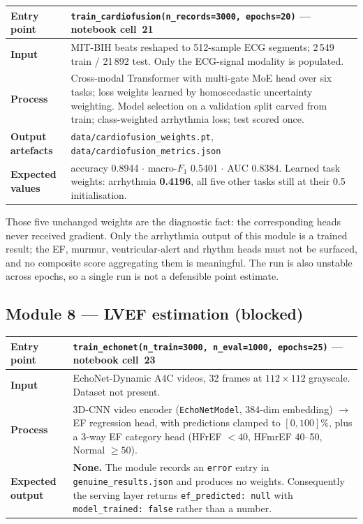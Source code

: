 \documentclass[11pt,a4paper]{article}
\newcommand{\code}[1]{\texttt{\small #1}}
\begin{document}
\begin{table}[!ht]
\centering
\small
\begin{tabular}{@{}p{2.4cm}p{12.4cm}@{}}
\toprule
\textbf{Entry point} & \code{train\_cardiofusion(n\_records=3000,
epochs=20)} --- notebook cell~21\\
\midrule
\textbf{Input} & MIT-BIH beats reshaped to 512-sample ECG segments;
2\,549 train / 21\,892 test. Only the ECG-signal modality is populated.\\
\addlinespace
\textbf{Process} & Cross-modal Transformer with multi-gate MoE head over
six tasks; loss weights learned by homoscedastic uncertainty weighting.
Model selection on a validation split carved from train; class-weighted
arrhythmia loss; test scored once.\\
\addlinespace
\textbf{Output artefacts} & \code{data/cardiofusion\_weights.pt},
\code{data/cardiofusion\_metrics.json}\\
\addlinespace
\textbf{Expected values} & accuracy 0.8944 $\cdot$ macro-$F_1$ 0.5401
$\cdot$ AUC 0.8384. Learned task weights: arrhythmia \textbf{0.4196}, all
five other tasks still at their 0.5 initialisation.\\
\bottomrule
\end{tabular}
\end{table}

\noindent
Those five unchanged weights are the diagnostic fact: the corresponding
heads never received gradient. Only the arrhythmia output of this module
is a trained result; the EF, murmur, ventricular-alert and rhythm heads
must not be surfaced, and no composite score aggregating them is
meaningful. The run is also unstable across epochs, so a single run is not
a defensible point estimate.

\subsection{Module 8 --- LVEF estimation (blocked)}

\begin{table}[!ht]
\centering
\small
\begin{tabular}{@{}p{2.4cm}p{12.4cm}@{}}
\toprule
\textbf{Entry point} & \code{train\_echonet(n\_train=3000, n\_eval=1000,
epochs=25)} --- notebook cell~23\\
\midrule
\textbf{Input} & EchoNet-Dynamic A4C videos, 32 frames at
$112\times112$ grayscale. \textcolor{dcwarn}{Dataset not present.}\\
\addlinespace
\textbf{Process} & 3D-CNN video encoder (\code{EchoNetModel},
384-dim embedding) $\rightarrow$ EF regression head, with predictions
clamped to $[0,100]\%$, plus a 3-way EF category head
(HFrEF $<40$, HFmrEF 40--50, Normal $\geq50$).\\
\addlinespace
\textbf{Expected output} & \textcolor{dcwarn}{\textbf{None.}} The module
records an \code{error} entry in \code{genuine\_results.json} and produces
no weights. Consequently the serving layer returns
\code{ef\_predicted: null} with \code{model\_trained: false} rather than a
number.\\
\bottomrule
\end{tabular}
\end{table}
\end{document}
